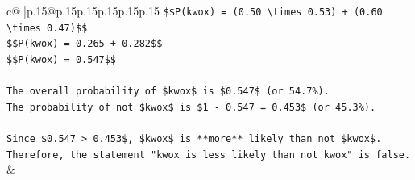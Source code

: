 \documentclass{article}
\begin{document}
{\begin{supertabular}{c@{$\;$}|p{.15\linewidth}@{}p{.15\linewidth}p{.15\linewidth}p{.15\linewidth}p{.15\linewidth}p{.15\linewidth}}
{{{\texttt{\$\$P(kwox) = (0.50 \textbackslash{}times 0.53) + (0.60 \textbackslash{}times 0.47)\$\$} \\
\texttt{\$\$P(kwox) = 0.265 + 0.282\$\$} \\
\texttt{\$\$P(kwox) = 0.547\$\$} \\
\\ 
\texttt{The overall probability of \$kwox\$ is \$0.547\$ (or 54.7\%).} \\
\texttt{The probability of not \$kwox\$ is \$1 {-} 0.547 = 0.453\$ (or 45.3\%).} \\
\\ 
\texttt{Since \$0.547 > 0.453\$, \$kwox\$ is **more** likely than not \$kwox\$. Therefore, the statement "kwox is less likely than not kwox" is false.} \\
            }
        }
    }
    & \\ \\


\end{supertabular}}
\end{document}
